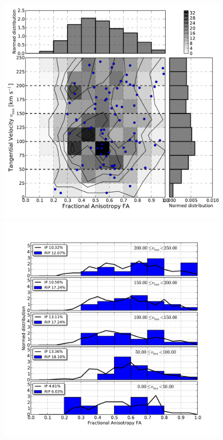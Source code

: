 \documentclass[usenatbib]{latex/mn2e}
\begin{document}
\begin{flushleft}
\begin{figure}
\begin{center}

  \includegraphics[trim = 2mm 9mm 3mm 4mm, clip, keepaspectratio=true,
  width=0.36\textheight]{./figures/2D_tangentialvelocity_FA_BDM_Tweb}
  \includegraphics[trim = 4mm 9mm 17mm 15mm, clip, keepaspectratio=true,
  width=0.36\textheight]{./figures/single_tangentialvelocity_FA_BDM_Tweb}
  

\end{center}
\end{figure}
\end{flushleft}
\end{document}
